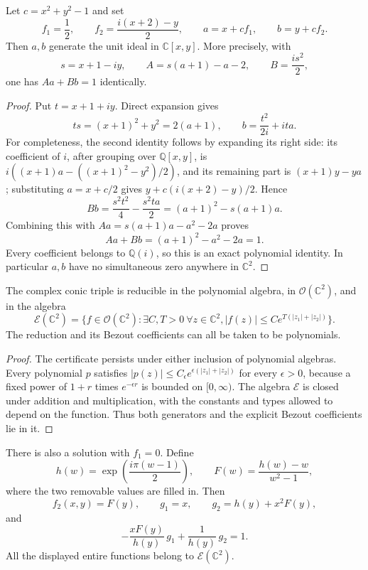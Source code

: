 \begin{proposition}\ours\quad
Let \(c=x^2+y^2-1\) and set
\[
 f_1=\frac12,\qquad
 f_2=\frac{i(x+2)-y}{2},\qquad
 a=x+cf_1,\qquad b=y+cf_2.
\]
Then \(a,b\) generate the unit ideal in \(\mathbb C[x,y]\). More precisely,
with
\[
 s=x+1-iy,\qquad
 A=s(a+1)-a-2,\qquad B=\frac{i s^2}{2},
\]
one has \(Aa+Bb=1\) identically.
\end{proposition}

\begin{proof}
Put \(t=x+1+iy\). Direct expansion gives
\[
 ts=(x+1)^2+y^2=2(a+1),
 \qquad
 b=\frac{t^2}{2i}+ita.
\]
For completeness, the second identity follows by expanding its right side:
its coefficient of \(i\), after grouping over \(\mathbb Q[x,y]\), is
\(i((x+1)a-((x+1)^2-y^2)/2)\), and its remaining part is
\((x+1)y-ya\); substituting \(a=x+c/2\) gives
\(y+c(i(x+2)-y)/2\). Hence
\[
 Bb=\frac{s^2t^2}{4}-\frac{s^2t a}{2}
    =(a+1)^2-s(a+1)a.
\]
Combining this with \(Aa=s(a+1)a-a^2-2a\) proves
\[
 Aa+Bb=(a+1)^2-a^2-2a=1.
\]
Every coefficient belongs to \(\mathbb Q(i)\), so this is an exact polynomial
identity. In particular \(a,b\) have no simultaneous zero anywhere in
\(\mathbb C^2\).
\end{proof}

\begin{corollary}\ours\quad
The complex conic triple is reducible in the polynomial algebra, in
\(\mathcal O(\mathbb C^2)\), and in the algebra
\[
 \mathcal E(\mathbb C^2)=
 \{f\in\mathcal O(\mathbb C^2):
   \exists C,T>0\ \forall z\in\mathbb C^2,   |f(z)|\le C e^{T(|z_1|+|z_2|)}\}.
\]
The reduction and its Bezout coefficients can all be taken to be polynomials.
\end{corollary}

\begin{proof}
The certificate persists under either inclusion of polynomial algebras.
Every polynomial \(p\) satisfies
\(|p(z)|\le C_\epsilon e^{\epsilon(|z_1|+|z_2|)}\) for every
\(\epsilon>0\), because a fixed power of \(1+r\) times
\(e^{-\epsilon r}\) is bounded on \([0,\infty)\). The algebra
\(\mathcal E\) is closed under addition and multiplication, with the
constants and types allowed to depend on the function. Thus both generators
and the explicit Bezout coefficients lie in it.
\end{proof}

\begin{proposition}\ours\quad
There is also a solution with \(f_1=0\). Define
\[
 h(w)=\exp\!\left(\frac{i\pi(w-1)}2\right),\qquad
 F(w)=\frac{h(w)-w}{w^2-1},
\]
where the two removable values are filled in. Then
\[
 f_2(x,y)=F(y),\qquad
 g_1=x,\qquad g_2=h(y)+x^2F(y),
\]
and
\[
 -\frac{xF(y)}{h(y)}\,g_1+\frac1{h(y)}\,g_2=1.
\]
All the displayed entire functions belong to \(\mathcal E(\mathbb C^2)\).
\end{proposition}


